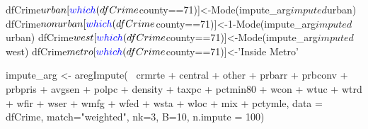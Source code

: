 \documentclass[]{article}
\newenvironment{Shaded}{}{}
\newcommand{\DataTypeTok}[1]{#1}
\newcommand{\DecValTok}[1]{#1}
\newcommand{\KeywordTok}[1]{\textcolor[rgb]{0.00,0.00,1.00}{#1}}
\newcommand{\NormalTok}[1]{#1}
\newcommand{\OperatorTok}[1]{#1}
\newcommand{\StringTok}[1]{\textcolor[rgb]{0.00,0.50,0.50}{#1}}
\begin{document}
\begin{Shaded}
\begin{Highlighting}[]
\NormalTok{dfCrime}\OperatorTok{$}\NormalTok{urban[}\KeywordTok{which}\NormalTok{(dfCrime}\OperatorTok{$}\NormalTok{county}\OperatorTok{==}\DecValTok{71}\NormalTok{)]<-}\KeywordTok{Mode}\NormalTok{(impute_arg}\OperatorTok{$}\NormalTok{imputed}\OperatorTok{$}\NormalTok{urban)}
\NormalTok{dfCrime}\OperatorTok{$}\NormalTok{nonurban[}\KeywordTok{which}\NormalTok{(dfCrime}\OperatorTok{$}\NormalTok{county}\OperatorTok{==}\DecValTok{71}\NormalTok{)]<-}\DecValTok{1}\OperatorTok{-}\KeywordTok{Mode}\NormalTok{(impute_arg}\OperatorTok{$}\NormalTok{imputed}\OperatorTok{$}\NormalTok{urban)}
\NormalTok{dfCrime}\OperatorTok{$}\NormalTok{west[}\KeywordTok{which}\NormalTok{(dfCrime}\OperatorTok{$}\NormalTok{county}\OperatorTok{==}\DecValTok{71}\NormalTok{)]<-}\KeywordTok{Mode}\NormalTok{(impute_arg}\OperatorTok{$}\NormalTok{imputed}\OperatorTok{$}\NormalTok{west)}
\NormalTok{dfCrime}\OperatorTok{$}\NormalTok{metro[}\KeywordTok{which}\NormalTok{(dfCrime}\OperatorTok{$}\NormalTok{county}\OperatorTok{==}\DecValTok{71}\NormalTok{)]<-}\StringTok{'Inside Metro'}
\end{Highlighting}
\end{Shaded}

\begin{Shaded}
\begin{Highlighting}[]
\NormalTok{impute_arg <-}\StringTok{ }\KeywordTok{aregImpute}\NormalTok{(}\OperatorTok{~}\StringTok{ }\NormalTok{crmrte }\OperatorTok{+}\StringTok{ }\NormalTok{central }\OperatorTok{+}\StringTok{ }\NormalTok{other }\OperatorTok{+}
\StringTok{                         }\NormalTok{prbarr }\OperatorTok{+}\StringTok{ }\NormalTok{prbconv }\OperatorTok{+}\StringTok{ }\NormalTok{prbpris }\OperatorTok{+}\StringTok{ }\NormalTok{avgsen }\OperatorTok{+}\StringTok{ }\NormalTok{polpc }\OperatorTok{+}\StringTok{ }
\StringTok{                         }\NormalTok{density }\OperatorTok{+}\StringTok{ }\NormalTok{taxpc }\OperatorTok{+}\StringTok{ }\NormalTok{pctmin80 }\OperatorTok{+}\StringTok{ }\NormalTok{wcon }\OperatorTok{+}\StringTok{ }\NormalTok{wtuc }\OperatorTok{+}
\StringTok{                         }\NormalTok{wtrd }\OperatorTok{+}\StringTok{ }\NormalTok{wfir }\OperatorTok{+}\StringTok{ }\NormalTok{wser }\OperatorTok{+}\StringTok{ }\NormalTok{wmfg }\OperatorTok{+}\StringTok{ }\NormalTok{wfed }\OperatorTok{+}\StringTok{ }\NormalTok{wsta }\OperatorTok{+}\StringTok{ }\NormalTok{wloc }\OperatorTok{+}
\StringTok{                         }\NormalTok{mix }\OperatorTok{+}\StringTok{ }\NormalTok{pctymle, }\DataTypeTok{data =}\NormalTok{ dfCrime, }\DataTypeTok{match=}\StringTok{"weighted"}\NormalTok{,}
                         \DataTypeTok{nk=}\DecValTok{3}\NormalTok{, }\DataTypeTok{B=}\DecValTok{10}\NormalTok{, }\DataTypeTok{n.impute =} \DecValTok{100}\NormalTok{)}
\end{Highlighting}
\end{Shaded}
\end{document}
